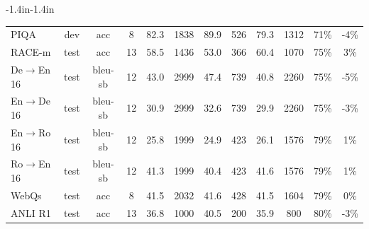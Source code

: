 \begin{table}
{\begin{adjustwidth}{-1.4in}{-1.4in}
\begin{center}
\begin{tabular}{lccccccccccc}
                PIQA &   dev &      acc &   8 &        82.3 &                      1838 &                            89.9 &                       526 &                            79.3 &                      1312 &                            71\% &                                                -4\% \\
              RACE-m &  test &      acc &  13 &        58.5 &                      1436 &                            53.0 &                       366 &                            60.4 &                      1070 &                            75\% &                                                 3\% \\
        De$\to$En 16 &  test &  bleu-sb &  12 &        43.0 &                      2999 &                            47.4 &                       739 &                            40.8 &                      2260 &                            75\% &                                                -5\% \\
        En$\to$De 16 &  test &  bleu-sb &  12 &        30.9 &                      2999 &                            32.6 &                       739 &                            29.9 &                      2260 &                            75\% &                                                -3\% \\
        En$\to$Ro 16 &  test &  bleu-sb &  12 &        25.8 &                      1999 &                            24.9 &                       423 &                            26.1 &                      1576 &                            79\% &                                                 1\% \\
        Ro$\to$En 16 &  test &  bleu-sb &  12 &        41.3 &                      1999 &                            40.4 &                       423 &                            41.6 &                      1576 &                            79\% &                                                 1\% \\
               WebQs &  test &      acc &   8 &        41.5 &                      2032 &                            41.6 &                       428 &                            41.5 &                      1604 &                            79\% &                                                 0\% \\
             ANLI R1 &  test &      acc &  13 &        36.8 &                      1000 &                            40.5 &                       200 &                            35.9 &                       800 &                            80\% &                                                -3\% \\

\end{tabular}
\end{center}
\end{adjustwidth}}
\end{table}
